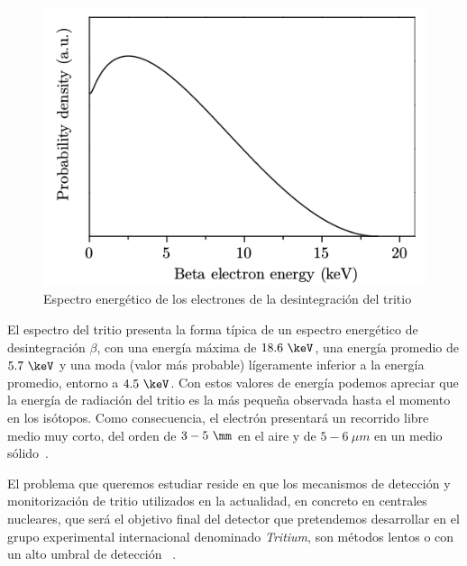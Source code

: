 \begin{figure}[hbtp]
\includegraphics[scale=0.6]{Espectro.png}
\centering
\caption{Espectro energético de los electrones de la desintegración del tritio ~\cite{TesisTritio}\label{fig:Espectrotritio}}
\end{figure}

El espectro del tritio presenta la forma típica de un espectro energético de desintegración $\beta$, con una energía máxima de $18.6~\keV$, una energía promedio de $5.7~\keV$ y una moda (valor más probable) lígeramente inferior a la energía promedio, entorno a $4.5~\keV$. Con estos valores de energía podemos apreciar que la energía de radiación del tritio es la más pequeña observada hasta el momento en los isótopos. Como consecuencia, el electrón presentará un recorrido libre medio muy corto, del orden de $3-5~\mm$ en el aire y de $5-6~\mu m$ en un medio sólido~\cite{Isotopos}.

El problema que queremos estudiar  reside en que los mecanismos de detección y monitorización de tritio utilizados en la actualidad, en concreto en centrales nucleares, que será el objetivo final del detector que pretendemos desarrollar en el grupo experimental internacional denominado \textit{Tritium}, son métodos lentos o con un alto umbral de detección ~\cite{limiteMB, Limitetiempo, Limite}. 


